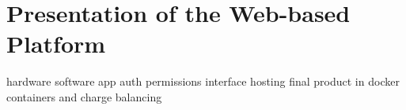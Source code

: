 \section{Presentation of the Web-based Platform}
hardware
software
app
    auth
    permissions
    interface
    hosting final product in docker containers and charge balancing